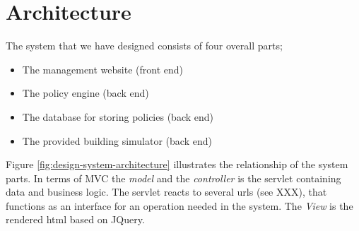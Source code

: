 \section{Architecture}
The system that we have designed consists of four overall parts;
\begin{itemize}
	\item The management website (front end)
	\item The policy engine (back end)
	\item The database for storing policies (back end)
	\item The provided building simulator (back end)
\end{itemize}

Figure \ref{fig:design-system-architecture} illustrates the relationship of the system parts. In terms of MVC the \textit{model} and the \textit{controller} is the servlet containing data and business logic. The servlet reacts to several urls (see XXX), that functions as an interface for an operation needed in the system. The \textit{View} is the rendered html based on JQuery.

\begin{figure}[t]
\end{figure}

